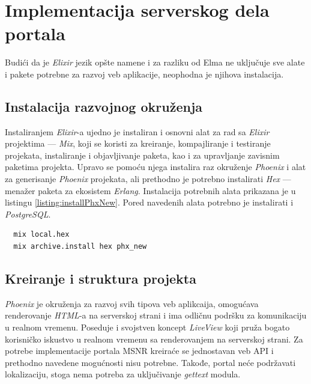 \documentclass[12pt,oneside]{memoir}
\begin{document}
\chapter{Implementacija serverskog dela portala}

Budići da je \emph{Elixir} jezik opšte namene i za razliku od Elma ne uključuje sve alate i pakete
potrebne za razvoj veb aplikacije, neophodna je njihova instalacija.

\section{Instalacija razvojnog okruženja}
Instaliranjem \emph{Elixir}-a ujedno je instaliran i osnovni alat za rad sa \emph{Elixir} projektima --- \emph{Mix}, koji se koristi za
kreiranje, kompajliranje i testiranje projekata, instaliranje i objavljivanje paketa, kao i za upravljanje zavisnim paketima projekta.
Upravo se pomoću njega instalira raz okruženje \emph{Phoenix} i alat za generisanje \emph{Phoenix} projekata, ali prethodno je potrebno instalirati
\emph{Hex} \cite{hex} --- menažer paketa za ekosistem \emph{Erlang}. Instalacija potrebnih alata prikazana je u listingu \ref{listing:installPhxNew}.
Pored navedenih alata potrebno je instalirati i \emph{PostgreSQL}.

\begin{listing}[h]
\begin{verbatim}
  mix local.hex
  mix archive.install hex phx_new
\end{verbatim}
\caption{Instalacija alata \emph{hex} i \emph{phx{\textunderscore}new}}
\label{listing:installPhxNew}
\end{listing}

\section{Kreiranje i struktura projekta}
\emph{Phoenix} je okruženja za razvoj svih tipova veb aplikcaija, omogućava renderovanje \emph{HTML}-a na serverskoj strani i ima odličnu podršku
za komunikaciju u realnom vremenu. Poseduje i svojstven koncept \emph{LiveView} koji pruža bogato korisničko iskustvo u realnom vremenu sa
renderovanjem na serverskoj strani. Za potrebe implementacije portala MSNR kreiraće se jednostavan veb API i prethodno navedene mogućnosti nisu potrebne.
Takođe, portal neće podržavati lokalizaciju, stoga nema potreba za uključivanje \emph{gettext} modula.
\end{document}
